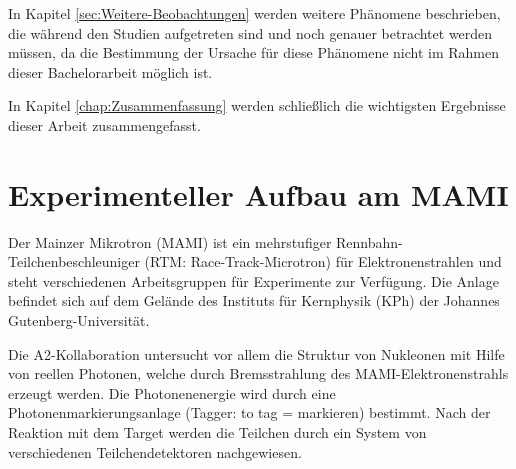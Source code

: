 \documentclass[a4paper,11pt,oneside,final,german,openbib,pdftex]{scrbook}
\begin{document}
{In Kapitel \ref{sec:Weitere-Beobachtungen} werden weitere Phänomene beschrieben, die während den Studien aufgetreten sind und noch genauer betrachtet werden müssen, da die Bestimmung der Ursache für diese Phänomene nicht im Rahmen dieser Bachelorarbeit möglich ist. 

In Kapitel \ref{chap:Zusammenfassung} werden schließlich die wichtigsten Ergebnisse dieser Arbeit zusammengefasst.






\chapter{Experimenteller Aufbau am MAMI}
\label{chap:Exp-Aufbau}




Der Mainzer Mikrotron (MAMI) ist ein mehrstufiger Rennbahn-Teilchenbeschleuniger (RTM: Race-Track-Microtron) für Elektronenstrahlen und steht verschiedenen Arbeitsgruppen für Experimente zur Verfügung. Die Anlage befindet sich auf dem Gelände des Instituts für Kernphysik (KPh) der Johannes Gutenberg-Universität.

Die A2-Kollaboration untersucht vor allem die Struktur von Nukleonen mit Hilfe von reellen Photonen, welche durch Bremsstrahlung des MAMI-Elektronenstrahls erzeugt werden. Die Photonenenergie wird durch eine Photonenmarkierungsanlage (Tagger: to tag = markieren) bestimmt. Nach der Reaktion mit dem Target werden die Teilchen durch ein System von verschiedenen Teilchendetektoren nachgewiesen.

\begin{figure}[h!]
	

\end{figure}}
\end{document}
